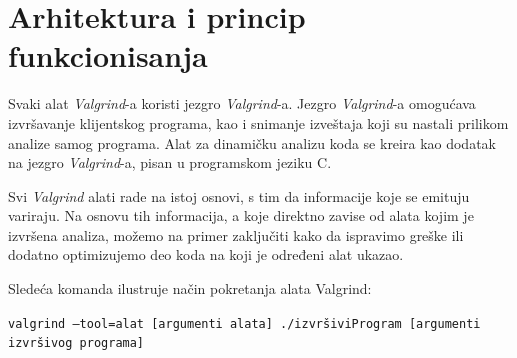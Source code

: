 \documentclass[12pt,oneside]{memoir}
\theoremstyle{plain}
\theoremstyle{definition}
\begin{document}
\section{Arhitektura i princip funkcionisanja}

Svaki alat \textit{Valgrind}-a koristi jezgro \textit{Valgrind}-a. Jezgro \textit{Valgrind}-a omogućava izvršavanje klijentskog programa, kao i snimanje izveštaja koji su nastali prilikom analize samog programa. Alat za dinamičku analizu koda se kreira kao dodatak na jezgro \textit{Valgrind}-a, pisan u programskom jeziku C.


Svi \textit{Valgrind} alati rade na istoj osnovi, s tim da informacije koje se emituju variraju. Na osnovu tih informacija, a koje direktno zavise od alata kojim je izvršena analiza, možemo na primer zaključiti kako da ispravimo greške ili dodatno optimizujemo deo koda na koji je određeni alat ukazao. %

Sledeća komanda ilustruje način pokretanja alata Valgrind:
\begin{center}
\texttt{valgrind --tool=alat [argumenti alata] ./izvršiviProgram [argumenti izvršivog programa]}
\end{center}
\end{document}

